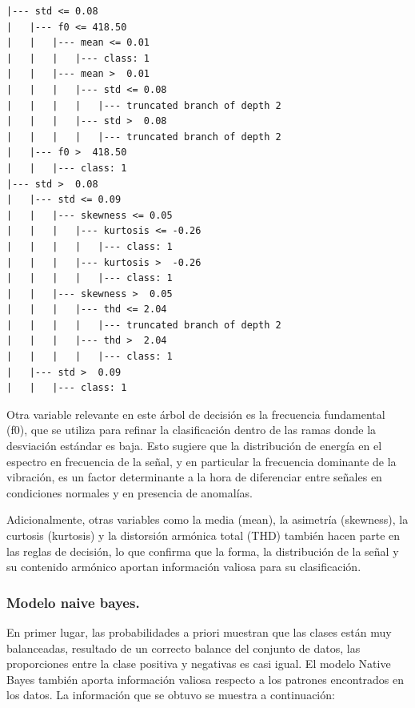 \documentclass[11pt,a4paper,spanish]{book}
\numberwithin{equation}{chapter}
\numberwithin{figure}{chapter}
\begin{document}
\vspace{5mm}
\begin{lstlisting}[language={}, basicstyle=\ttfamily\footnotesize\color{black}, frame=lines]
|--- std <= 0.08
|   |--- f0 <= 418.50
|   |   |--- mean <= 0.01
|   |   |   |--- class: 1
|   |   |--- mean >  0.01
|   |   |   |--- std <= 0.08
|   |   |   |   |--- truncated branch of depth 2
|   |   |   |--- std >  0.08
|   |   |   |   |--- truncated branch of depth 2
|   |--- f0 >  418.50
|   |   |--- class: 1
|--- std >  0.08
|   |--- std <= 0.09
|   |   |--- skewness <= 0.05
|   |   |   |--- kurtosis <= -0.26
|   |   |   |   |--- class: 1
|   |   |   |--- kurtosis >  -0.26
|   |   |   |   |--- class: 1
|   |   |--- skewness >  0.05
|   |   |   |--- thd <= 2.04
|   |   |   |   |--- truncated branch of depth 2
|   |   |   |--- thd >  2.04
|   |   |   |   |--- class: 1
|   |--- std >  0.09
|   |   |--- class: 1
\end{lstlisting}


Otra variable relevante en este árbol de decisión es la frecuencia fundamental (f0), 
que se utiliza para refinar la clasificación dentro de las ramas donde la desviación 
estándar es baja. Esto sugiere que la distribución de energía en el espectro en 
frecuencia de la señal, y en particular la frecuencia dominante de la vibración, es un 
factor determinante a la hora de diferenciar entre señales en condiciones normales y en 
presencia de anomalías. 


Adicionalmente, otras variables como la media (mean), la asimetría (skewness), la 
curtosis (kurtosis) y la distorsión armónica total (THD) también hacen parte en las 
reglas de decisión, lo que confirma que la forma, la distribución de la señal y su 
contenido armónico aportan información valiosa para su clasificación.



\subsubsection{Modelo naive bayes.}

En primer lugar, las probabilidades a priori muestran que las clases están muy 
balanceadas, resultado de un correcto balance del conjunto de datos, las proporciones 
entre la clase positiva y negativas es casi igual. 
El modelo Native Bayes también aporta información valiosa respecto a los patrones 
encontrados en los datos. La información que se obtuvo se muestra a continuación:  
\end{document}
